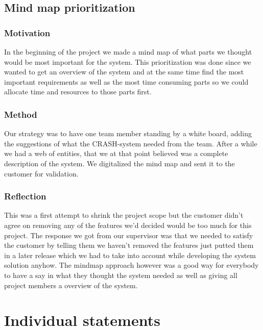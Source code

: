 \documentclass[10pt]{article}
\begin{document}
\subsection{Mind map prioritization}
\subsubsection{Motivation}
In the beginning of the project we made a mind map of what parts we thought would be most important for the system. This prioritization was done since we wanted to get an overview of the system and at the same time find the most important requirements as well as the most time consuming parts so we could allocate time and resources to those parts first.
\subsubsection{Method}
Our strategy was to have one team member standing by a white board, adding the suggestions of what the CRASH-system needed from the team. After a while we had a web of entities, that we at that point believed was a complete description of the system. We digitalized the mind map and sent it to the customer for validation. 
\subsubsection{Reflection}
This was a first attempt to shrink the project scope but the customer didn't agree on removing any of the features we'd decided would be too much for this project. The response we got from our supervisor was that we needed to satisfy the customer by telling them we haven't removed the features just putted them in a later release which we had to take into account while developing the system solution anyhow.
The mindmap approach however was a good way for everybody to have a say in what they thought the system needed as well as giving all project members a overview of the system.


\section{Individual statements}
\noindent
{}
\end{document}
